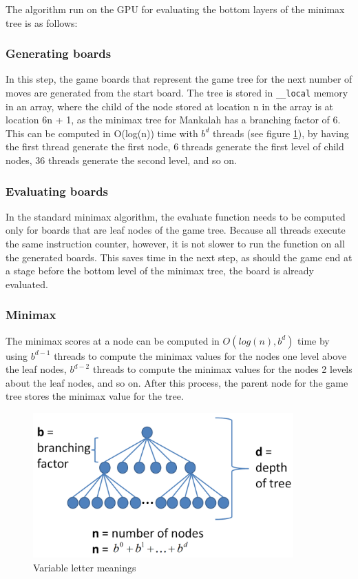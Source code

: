\documentclass{article}
\begin{document}
The algorithm run on the GPU for evaluating the bottom layers of the minimax tree is as follows:

\subsubsection{Generating boards}
In this step, the game boards that represent the game tree for the next number of moves are generated from the start board. The tree is stored in \texttt{\_\_local} memory in an array, where the child of the node stored at location n in the array is at location 6n + 1, as the minimax tree for Mankalah has a branching factor of 6. This can be computed in O(log(n)) time with $b^{d}$ threads (see figure \ref{fig:mankalahterms}), by having the first thread generate the first node, 6 threads generate the first level of child nodes, 36 threads generate the second level, and so on.

\subsubsection{Evaluating boards}
In the standard minimax algorithm, the evaluate function needs to be computed only for boards that are leaf nodes of the game tree. Because all threads execute the same instruction counter, however, it is not slower to run the function on all the generated boards. This saves time in the next step, as should the game end at a stage before the bottom level of the minimax tree, the board is already evaluated.

\subsubsection{Minimax}
The minimax scores at a node can be computed in $O(log(n),b^{d})$ time by using $b^{d-1}$ threads to compute the minimax values for the nodes one level above the leaf nodes, $b^{d-2}$ threads to compute the minimax values for the nodes 2 levels about the leaf nodes, and so on. After this process, the parent node for the game tree stores the minimax value for the tree.

\begin{figure}[ht!]
\centering
\includegraphics[width=100mm]{mankalah-terms.png}
\caption{Variable letter meanings}
\label{fig:mankalahterms}
\end{figure}
\end{document}
